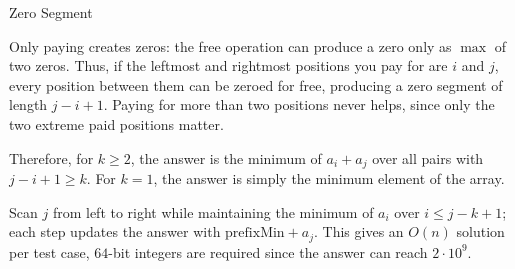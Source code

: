 \begin{tutorial}{Zero Segment}

Only paying creates zeros: the free operation can produce a zero only as $\max$ of two zeros. Thus, if the leftmost and rightmost positions you pay for are $i$ and $j$, every position between them can be zeroed for free, producing a zero segment of length $j - i + 1$. Paying for more than two positions never helps, since only the two extreme paid positions matter.

Therefore, for $k \ge 2$, the answer is the minimum of $a_i + a_j$ over all pairs with $j - i + 1 \ge k$. For $k = 1$, the answer is simply the minimum element of the array.

Scan $j$ from left to right while maintaining the minimum of $a_i$ over $i \le j - k + 1$; each step updates the answer with $\text{prefixMin} + a_j$. This gives an $O(n)$ solution per test case, $64$-bit integers are required since the answer can reach $2 \cdot 10^9$.


\end{tutorial}
